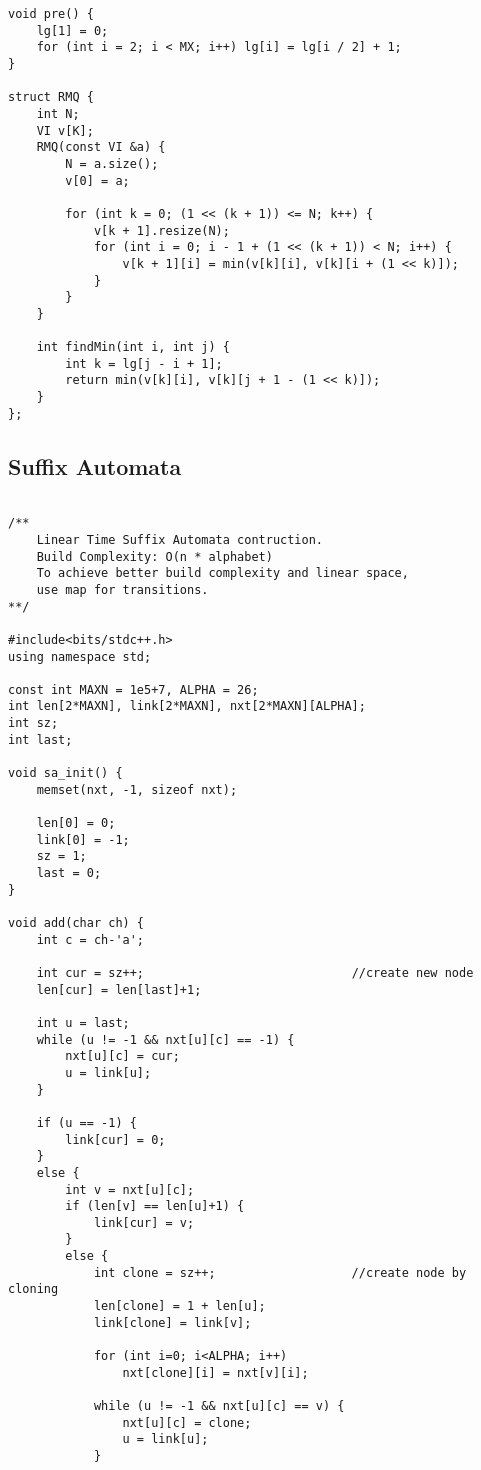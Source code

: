 \documentclass[FSZ,a4paper,onesided]{article}
\begin{document}
\begin{multicols*}{\COLS}
\begin{lstlisting}
void pre() {
    lg[1] = 0;
    for (int i = 2; i < MX; i++) lg[i] = lg[i / 2] + 1;
}

struct RMQ {
    int N;
    VI v[K];
    RMQ(const VI &a) {
        N = a.size();
        v[0] = a;

        for (int k = 0; (1 << (k + 1)) <= N; k++) {
            v[k + 1].resize(N);
            for (int i = 0; i - 1 + (1 << (k + 1)) < N; i++) {
                v[k + 1][i] = min(v[k][i], v[k][i + (1 << k)]);
            }
        }
    }

    int findMin(int i, int j) {
        int k = lg[j - i + 1];
        return min(v[k][i], v[k][j + 1 - (1 << k)]);
    }
};
\end{lstlisting}
\subsection{Suffix Automata}
\begin{lstlisting}

/**
    Linear Time Suffix Automata contruction.
    Build Complexity: O(n * alphabet)
    To achieve better build complexity and linear space,
    use map for transitions.
**/

#include<bits/stdc++.h>
using namespace std;

const int MAXN = 1e5+7, ALPHA = 26;
int len[2*MAXN], link[2*MAXN], nxt[2*MAXN][ALPHA];
int sz;
int last;

void sa_init() {
    memset(nxt, -1, sizeof nxt);

    len[0] = 0;
    link[0] = -1;
    sz = 1;
    last = 0;
}

void add(char ch) {
    int c = ch-'a';

    int cur = sz++;                             //create new node
    len[cur] = len[last]+1;

    int u = last;
    while (u != -1 && nxt[u][c] == -1) {
        nxt[u][c] = cur;
        u = link[u];
    }

    if (u == -1) {
        link[cur] = 0;
    }
    else {
        int v = nxt[u][c];
        if (len[v] == len[u]+1) {
            link[cur] = v;
        }
        else {
            int clone = sz++;                   //create node by cloning
            len[clone] = 1 + len[u];
            link[clone] = link[v];

            for (int i=0; i<ALPHA; i++)
                nxt[clone][i] = nxt[v][i];

            while (u != -1 && nxt[u][c] == v) {
                nxt[u][c] = clone;
                u = link[u];
            }


\end{lstlisting}
\end{multicols*}
\end{document}
